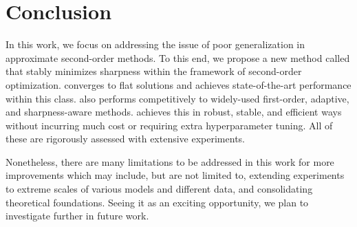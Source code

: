 \section{Conclusion}
In this work, we focus on addressing the issue of poor generalization in approximate second-order methods.
To this end, we propose a new method called \sassha that stably minimizes sharpness within the framework of second-order optimization.
\sassha converges to flat solutions and achieves state-of-the-art performance within this class.
\sassha also performs competitively to widely-used first-order, adaptive, and sharpness-aware methods.
\sassha achieves this in robust, stable, and efficient ways without incurring much cost or requiring extra hyperparameter tuning.
All of these are rigorously assessed with extensive experiments.

Nonetheless, there are many limitations to be addressed in this work for more improvements which may include, but are not limited to, 
extending experiments to extreme scales of various models and different data, and consolidating theoretical foundations.
Seeing it as an exciting opportunity, we plan to investigate further in future work.



